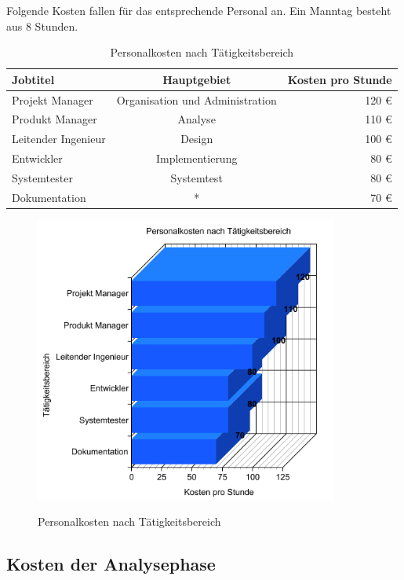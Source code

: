 Folgende Kosten fallen für das entsprechende Personal an. Ein Manntag besteht
aus 8 Stunden.

\begin{table}[H]
\caption{Personalkosten nach Tätigkeitsbereich}
\label{tab:personal}
\begin{center}
\begin{tabular}{|l|c|r|}
\hline
\textbf{Jobtitel} & \textbf{Hauptgebiet} & \textbf{Kosten pro Stunde}\\
\hline
Projekt Manager & Organisation und Administration & 120 €\\
\hline
Produkt Manager & Analyse & 110 €\\
\hline
Leitender Ingenieur & Design & 100 €\\
\hline
Entwickler & Implementierung & 80 €\\
\hline
Systemtester & Systemtest & 80 €\\
\hline
Dokumentation & * & 70 € \\
\hline
\end{tabular}
\end{center}
\label{default}
\end{table}

\begin{figure}[H]
\centering
\includegraphics[width=10cm]{images/graph.png}
\label{img:perso}
\caption{Personalkosten nach Tätigkeitsbereich}
\end{figure}


\subsection{Kosten der Analysephase}

